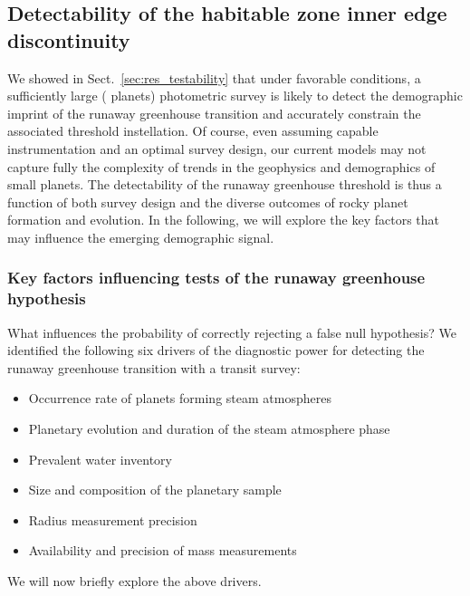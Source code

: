 \documentclass[twocolumn,twocolappendix]{aastex631}
\begin{document}
\subsection{Detectability of the habitable zone inner edge discontinuity}
We showed in Sect.~\ref{sec:res_testability} that under favorable conditions, a sufficiently large ( planets) photometric survey is likely to detect the demographic imprint of the runaway greenhouse transition and accurately constrain the associated threshold instellation.
Of course, even assuming capable instrumentation and an optimal survey design, our current models may not capture fully the complexity of trends in the geophysics and demographics of small planets.
The detectability of the runaway greenhouse threshold is thus a function of both survey design and the diverse outcomes of rocky planet formation and evolution.
In the following, we will explore the key factors that may influence the emerging demographic signal.

\subsubsection{Key factors influencing tests of the runaway greenhouse hypothesis}\label{sec:dis_keyfactors}
What influences the probability of correctly rejecting a false null hypothesis?
We identified the following six drivers of the diagnostic power for detecting the runaway greenhouse transition with a transit survey:
\begin{itemize}
    \item Occurrence rate of planets forming steam atmospheres
    \item Planetary evolution and duration of the steam atmosphere phase
    \item Prevalent water inventory
    \item Size and composition of the planetary sample
    \item Radius measurement precision
    \item Availability and precision of mass measurements
\end{itemize}
We will now briefly explore the above drivers.
\end{document}

